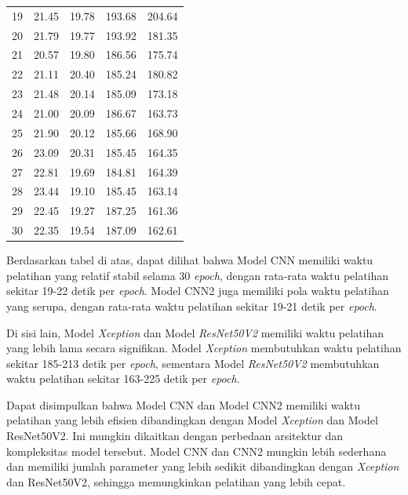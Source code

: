 \begin{table}[!hbt]
\begin{tabular}{|c|c|c|c|c|}
	19             & 21.45        & 19.78         & 193.68            & 204.64              \\
	20             & 21.79        & 19.77         & 193.92            & 181.35              \\
	21             & 20.57        & 19.80         & 186.56            & 175.74              \\
	22             & 21.11        & 20.40         & 185.24            & 180.82              \\
	23             & 21.48        & 20.14         & 185.09            & 173.18              \\
	24             & 21.00        & 20.09         & 186.67            & 163.73              \\
	25             & 21.90        & 20.12         & 185.66            & 168.90              \\
	26             & 23.09        & 20.31         & 185.45            & 164.35              \\
	27             & 22.81        & 19.69         & 184.81            & 164.39              \\
	28             & 23.44        & 19.10         & 185.45            & 163.14              \\
	29             & 22.45        & 19.27         & 187.25            & 161.36              \\
	30             & 22.35        & 19.54         & 187.09            & 162.61              \\ 
	\hline
	\end{tabular}
\end{table}

Berdasarkan tabel di atas, dapat dilihat bahwa Model CNN memiliki waktu pelatihan yang relatif stabil selama 30\textit{ epoch}, dengan rata-rata waktu pelatihan sekitar 19-22 detik per\textit{ epoch}. Model CNN2 juga memiliki pola waktu pelatihan yang serupa, dengan rata-rata waktu pelatihan sekitar 19-21 detik per\textit{ epoch}.

Di sisi lain, Model \textit{Xception} dan Model \textit{ResNet50V2 }memiliki waktu pelatihan yang lebih lama secara signifikan. Model \textit{Xception} membutuhkan waktu pelatihan sekitar 185-213 detik per\textit{ epoch}, sementara Model \textit{ResNet50V2 }membutuhkan waktu pelatihan sekitar 163-225 detik per\textit{ epoch}.
	
Dapat disimpulkan bahwa Model CNN dan Model CNN2 memiliki waktu pelatihan yang lebih efisien dibandingkan dengan Model \textit{Xception} dan Model ResNet50V2. Ini mungkin dikaitkan dengan perbedaan arsitektur dan kompleksitas model tersebut. Model CNN dan CNN2 mungkin lebih sederhana dan memiliki jumlah parameter yang lebih sedikit dibandingkan dengan \textit{Xception} dan ResNet50V2, sehingga memungkinkan pelatihan yang lebih cepat.

